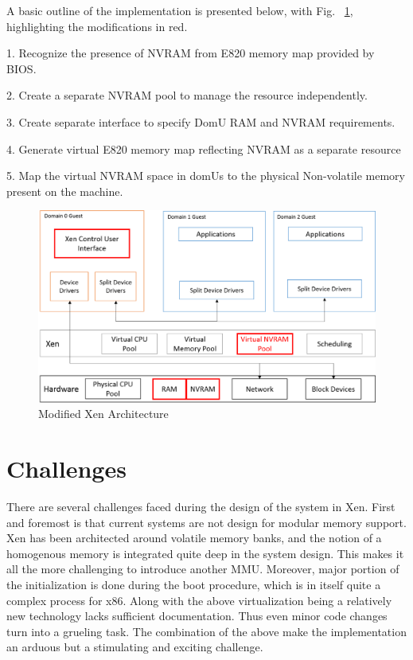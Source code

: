 A basic outline of the implementation is presented below, with Fig. ~\ref{fig:xen_mod}, highlighting the modifications in red. 

1. Recognize the presence of NVRAM from E820 memory map provided by BIOS. 

2. Create a separate NVRAM pool to manage the resource independently. 

3. Create separate interface to specify DomU RAM and NVRAM requirements. 

4. Generate virtual E820 memory map reflecting NVRAM as a separate resource 

5. Map the virtual NVRAM space in domUs to the physical Non-volatile memory present on the machine. 

\begin{figure}[H]
\centering
\includegraphics[scale=0.6]{figures/Xen_mod_model.png}
\caption{Modified Xen Architecture}
\label{fig:xen_mod}
\end{figure}

\section{Challenges}

There are several challenges faced during the design of the system in Xen. First and foremost is that current systems are not design for modular memory support. Xen has been architected around volatile memory banks, and the notion of a homogenous memory is integrated quite deep in the system design. This makes it all the more challenging to introduce another MMU. Moreover, major portion of the initialization is done during the boot procedure, which is in itself quite a complex process for x86. Along with the above virtualization being a relatively new technology lacks sufficient documentation. Thus even minor code changes turn into a grueling task. The combination of the above make the implementation an arduous but a stimulating and exciting challenge. 


